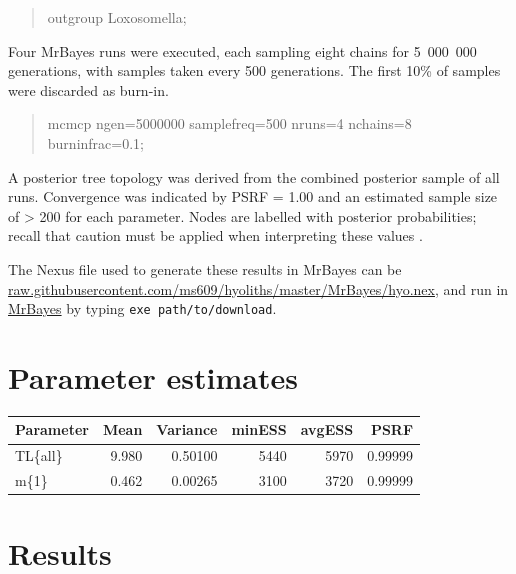 \documentclass[openany]{book}
\begin{document}
\begin{quote}
outgroup Loxosomella;
\end{quote}

Four MrBayes runs were executed, each sampling eight chains for
5~000~000 generations, with samples taken every 500 generations. The
first 10\% of samples were discarded as burn-in.

\begin{quote}
mcmcp ngen=5000000 samplefreq=500 nruns=4 nchains=8 burninfrac=0.1;
\end{quote}

A posterior tree topology was derived from the combined posterior sample
of all runs. Convergence was indicated by PSRF = 1.00 and an estimated
sample size of \textgreater{} 200 for each parameter. Nodes are labelled
with posterior probabilities; recall that caution must be applied when
interpreting these values \citep{Yang2018}.

The Nexus file used to generate these results in MrBayes can be
\href{https://raw.githubusercontent.com/ms609/hyoliths/master/MrBayes/hyo.nex}{raw.githubusercontent.com/ms609/hyoliths/master/MrBayes/hyo.nex},
and run in \href{http://mrbayes.sourceforge.net/download.php}{MrBayes}
by typing \texttt{exe\ path/to/download}.

\section{Parameter estimates}\label{parameter-estimates}

\begin{tabular}{l|r|r|r|r|r}
\hline
Parameter & Mean & Variance & minESS & avgESS & PSRF\\
\hline
TL\{all\} & 9.980 & 0.50100 & 5440 & 5970 & 0.99999\\
\hline
m\{1\} & 0.462 & 0.00265 & 3100 & 3720 & 0.99999\\
\hline
\end{tabular}

\section{Results}\label{results-2}
\end{document}

